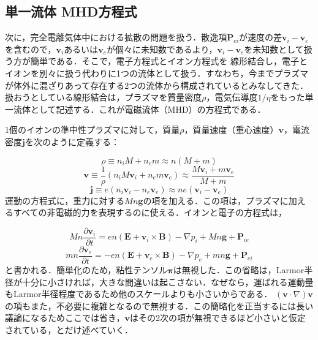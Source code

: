 \documentclass{ltjsarticle}
\numberwithin{equation}{section} %
\begin{document}
\subsection{単一流体 MHD方程式} \label{section5.7}
次に，完全電離気体中における拡散の問題を扱う．散逸項$\bm{P}_{ei}$が速度の差$\bm{v}_i - \bm{v}_e$を含むので，$\bm{v}_i$あるいは$\bm{v}_e$が個々に未知数であるより，$\bm{v}_i-\bm{v}_e$を未知数として扱う方が簡単である．そこで，電子方程式とイオン方程式を
線形結合し，電子とイオンを別々に扱う代わりに1つの流体として扱う．すなわち，今までプラズマが体外に混ざりあって存在する2つの流体から構成されているとみなしてきた．
扱おうとしている線形結合は，プラズマを質量密度$\rho$，電気伝導度$1/\eta$をもった単一流体として記述する．これが電磁流体（MHD）の方程式である．

1個のイオンの準中性プラズマに対して，質量$\rho$，質量速度（重心速度）$\bm{v}$，電流密度$\bm{j}$を次のように定義する：

\begin{equation}
  \rho \equiv n_iM + n_em \approx n(M+m) \label{5.78}
\end{equation}
\begin{equation}
  \bm{v} \equiv \frac{1}{\rho}(n_iM\bm{v}_i + n_em\bm{v}_e) \approx \frac{M\bm{v}_i + m\bm{v}_e}{M+m} \label{5.79}
\end{equation}
\begin{equation}
  \bm{j} \equiv e(n_i\bm{v}_i-n_e\bm{v}_e) \approx ne(\bm{v}_i - \bm{v}_e) \label{5.80}
\end{equation}
運動の方程式に，重力に対する$Mn\bm{g}$の項を加える．この項は，プラズマに加えるすべての非電磁的力を表現するのに使える．イオンと電子の方程式は，

\begin{equation}
  Mn\frac{\partial \bm{v}_i}{\partial t} = en(\bm{E}+\bm{v}_i \times \bm{B}) - \nabla p_i + Mn\bm{g} + \bm{P}_{ie} \label{5.81}
\end{equation}
\begin{equation}
  mn\frac{\partial \bm{v}_e}{\partial t} = -en(\bm{E}+\bm{v}_e \times \bm{B}) - \nabla p_e + mn\bm{g} + \bm{P}_{ei} \label{5.82}
\end{equation}
と書かれる．簡単化のため，粘性テンソル$\bm{\pi}$は無視した．この省略は，Larmor半径が十分に小さければ，大きな間違いは起こさない．なぜなら，運ばれる運動量もLarmor半径程度であるため他のスケールよりも小さいからである．
$(\bm{v}\cdot \nabla)\bm{v}$の項もまた，不必要に複雑となるので無視する．この簡略化を正当するには長い議論になるためここでは省き，$\bm{v}$はその2次の項が無視できるほど小さいと仮定されている，とだけ述べていく．
\end{document}
